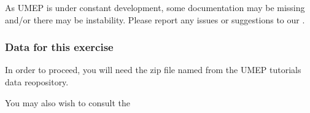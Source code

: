 \documentclass[letterpaper,10pt,english]{sphinxmanual}
\begin{document}
As UMEP is under constant development, some documentation may be missing
and/or there may be instability. Please report any issues or suggestions
to our .


\subsubsection{Data for this exercise}
\label{\detokenize{Tutorials/GQF:data-for-this-exercise}}
In order to proceed, you will need the zip file named
from the UMEP tutorials data reopository.

You may also wish to consult the 
\end{document}
